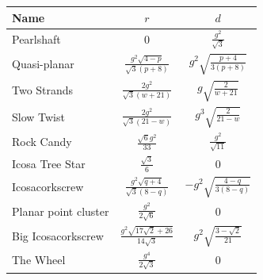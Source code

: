 \begin{center}
\small
\renewcommand{\arraystretch}{1.6}
\begin{tabular}{@{}lcc@{}}
\toprule
Name & $r$ & $d$\\
\midrule
Pearlshaft & $\displaystyle 0$ & $\displaystyle \frac{g^{2}}{\sqrt{3}}$\\
Quasi-planar & $\displaystyle \frac{g^{2} \sqrt{4 - p}}{\sqrt{3} \left(p + 8\right)}$ & $\displaystyle g^{2} \sqrt{\frac{p + 4}{3 \left(p + 8\right)}}$\\
Two Strands & $\displaystyle \frac{2 g^{2}}{\sqrt{3} \left(w + 21\right)}$ & $\displaystyle g \sqrt{\frac{2}{w + 21}}$\\
Slow Twist & $\displaystyle \frac{2 g^{2}}{\sqrt{3} \left(21 - w\right)}$ & $\displaystyle g^{3} \sqrt{\frac{2}{21 - w}}$\\
Rock Candy & $\displaystyle \frac{\sqrt{6} g^{2}}{33}$ & $\displaystyle \frac{g^{2}}{\sqrt{11}}$\\
Icosa Tree Star & $\displaystyle \frac{\sqrt{3}}{6}$ & $\displaystyle 0$\\
Icosacorkscrew & $\displaystyle \frac{g^{2} \sqrt{q + 4}}{\sqrt{3} \left(8 - q\right)}$ & $\displaystyle - g^{2} \sqrt{\frac{4 - q}{3 \left(8 - q\right)}}$\\
Planar point cluster & $\displaystyle \frac{g^{2}}{2 \sqrt{6}}$ & $\displaystyle 0$\\
Big Icosacorkscrew & $\displaystyle \frac{g^{2} \sqrt{17 \sqrt{2} + 26}}{14 \sqrt{3}}$ & $\displaystyle g^{2} \sqrt{\frac{3 - \sqrt{2}}{21}}$\\
The Wheel & $\displaystyle \frac{g^{4}}{2 \sqrt{3}}$ & $\displaystyle 0$\\
\bottomrule
\end{tabular}
\end{center}
